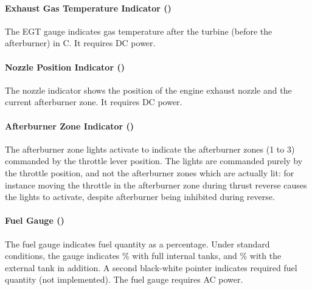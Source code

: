 \documentclass[a4paper]{report}
\begin{document}
\paragraph{Exhaust Gas Temperature Indicator ()}
The EGT gauge indicates gas temperature after the turbine
(before the afterburner) in \textdegree{}C.
It requires DC power.

\paragraph{Nozzle Position Indicator ()}
The nozzle indicator shows the position of the engine exhaust nozzle and the current afterburner zone.
It requires DC power.

\paragraph{Afterburner Zone Indicator ()}
The afterburner zone lights activate to indicate the afterburner zones (1 to 3)
commanded by the throttle lever position.
The lights are commanded purely by the throttle position,
and not the afterburner zones which are actually lit:
for instance moving the throttle in the afterburner zone during thrust reverse
causes the lights to activate, despite afterburner being inhibited during reverse.

\paragraph{Fuel Gauge ()}
The fuel gauge indicates fuel quantity as a percentage.
Under standard conditions, the gauge indicates \% with full internal tanks,
and \% with the external tank in addition.
A second black-white pointer indicates required fuel quantity (not implemented).
The fuel gauge requires AC power.
\end{document}
